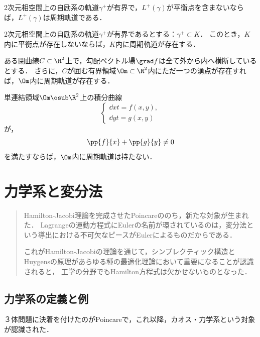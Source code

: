 \documentclass[uplatex,dvipdfmx]{jsreport}
\begin{document}
\begin{theorem}
    2次元相空間上の自励系の軌道$\gamma^+$が有界で，$L^+(\gamma)$が平衡点を含まないならば，$L^+(\gamma)$は周期軌道である．
\end{theorem}

\begin{theorem}
    2次元相空間上の自励系の軌道$\gamma^+$が有界であるとする：$\gamma^+\subset K$．
    このとき，$K$内に平衡点が存在しないならば，$K$内に周期軌道が存在する．
\end{theorem}

\begin{corollary}
    ある閉曲線$C\subset\R^2$上で，勾配ベクトル場$\grad f$は全て外から内へ横断しているとする．
    さらに，$C$が囲む有界領域$\Om\subset\R^2$内にただ一つの湧点が存在すれば，$\Om$内に周期軌道が存在する．
\end{corollary}

\begin{theorem}
    単連結領域$\Om\osub\R^2$上の積分曲線
    \[\begin{cases}
        \dd{x}{t}=f(x,y),\\
        \dd{y}{t}=g(x,y)
    \end{cases}\]
    が，
    \[\pp{f}{x}+\pp{g}{y}\ne0\]
    を満たすならば，$\Om$内に周期軌道は持たない．
\end{theorem}

\chapter{力学系と変分法}

\begin{quotation}
    Hamilton-Jacobi理論を完成させたPoincareののち，新たな対象が生まれた．
    Lagrangeの運動方程式にEulerの名前が環されているのは，変分法という導出における不可欠なピースがEulerによるものだからである．

    これがHamilton-Jacobiの理論を通じて，シンプレクティック構造とHuygensの原理があらゆる種の最適化理論において重要になることが認識されると，
    工学の分野でもHamilton方程式は欠かせないものとなった．
\end{quotation}

\section{力学系の定義と例}

\begin{tcolorbox}[colframe=ForestGreen, colback=ForestGreen!10!white,breakable,colbacktitle=ForestGreen!40!white,coltitle=black,fonttitle=\bfseries\sffamily,
title=]
    ３体問題に決着を付けたのがPoincareで，これ以降，カオス・力学系という対象が認識された．
\end{tcolorbox}
\end{document}
